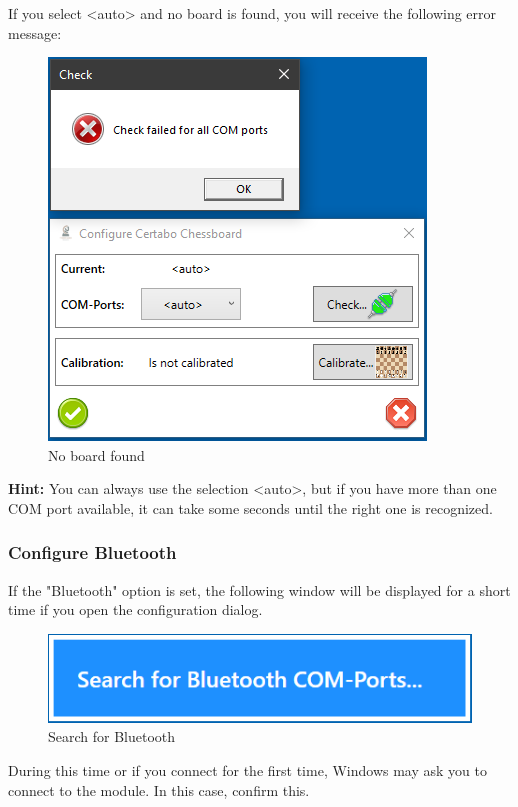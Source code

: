 \documentclass[11pt,a4paper]{article}
\begin{document}
If you select <auto> and no board is found, you will receive the following error message:

\begin{figure}[H]
	\centering
	\includegraphics[scale=0.9]{Calibrate3.png}
	\caption{No board found }
	\label{fig:Calibrate3}
\end{figure}

\textbf{Hint:} You can always use the selection <auto>, but if you have more than one COM port available, it can take some seconds until the right one is recognized.

\subsubsection{Configure Bluetooth} \label{CertaboBluetooth}

If the "Bluetooth" option is set, the following window will be displayed for a short time if you open the configuration dialog.

\begin{figure}[H]
	\centering
	\includegraphics[scale=0.8]{MillenniumChessLink10.png}
	\caption{Search for Bluetooth}
	\label{fig:CertaboBT10}
\end{figure}

During this time or if you connect for the first time, Windows may ask you to connect to the module. In this case, confirm this. 
\end{document}

